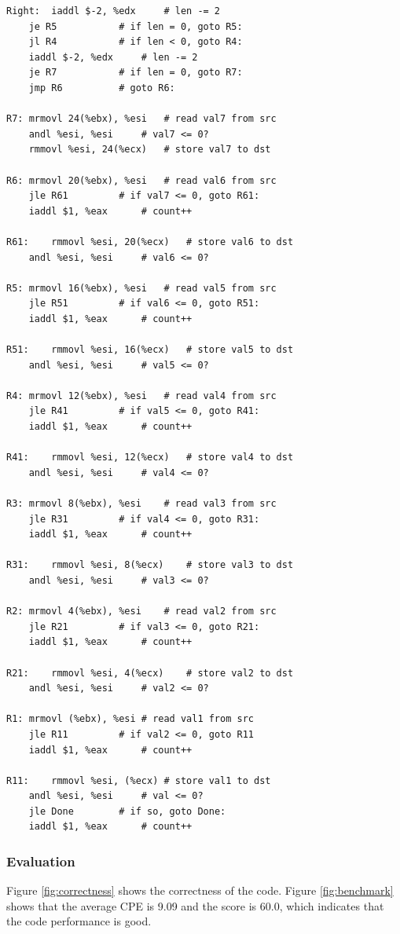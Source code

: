 \documentclass{article}
\begin{document}
\begin{lstlisting}[caption={Core Code of ncopy.ys}, label={cd:ncopy}]
Right:	iaddl $-2, %edx		# len -= 2
	je R5			# if len = 0, goto R5:
	jl R4			# if len < 0, goto R4:
	iaddl $-2, %edx		# len -= 2
	je R7			# if len = 0, goto R7:
	jmp R6			# goto R6:

R7:	mrmovl 24(%ebx), %esi	# read val7 from src
	andl %esi, %esi		# val7 <= 0?
	rmmovl %esi, 24(%ecx)	# store val7 to dst

R6:	mrmovl 20(%ebx), %esi	# read val6 from src
	jle R61			# if val7 <= 0, goto R61:
	iaddl $1, %eax		# count++

R61:	rmmovl %esi, 20(%ecx)	# store val6 to dst
	andl %esi, %esi		# val6 <= 0?

R5:	mrmovl 16(%ebx), %esi	# read val5 from src
	jle R51			# if val6 <= 0, goto R51:
	iaddl $1, %eax		# count++

R51:	rmmovl %esi, 16(%ecx)	# store val5 to dst
	andl %esi, %esi		# val5 <= 0?

R4:	mrmovl 12(%ebx), %esi	# read val4 from src
	jle R41			# if val5 <= 0, goto R41:
	iaddl $1, %eax		# count++
	
R41:	rmmovl %esi, 12(%ecx)	# store val4 to dst
	andl %esi, %esi		# val4 <= 0?

R3:	mrmovl 8(%ebx), %esi	# read val3 from src
	jle R31			# if val4 <= 0, goto R31:
	iaddl $1, %eax		# count++

R31:	rmmovl %esi, 8(%ecx)	# store val3 to dst
	andl %esi, %esi		# val3 <= 0?

R2:	mrmovl 4(%ebx), %esi	# read val2 from src
	jle R21			# if val3 <= 0, goto R21:
	iaddl $1, %eax		# count++

R21:	rmmovl %esi, 4(%ecx)	# store val2 to dst
	andl %esi, %esi		# val2 <= 0?

R1:	mrmovl (%ebx), %esi	# read val1 from src
	jle R11			# if val2 <= 0, goto R11
	iaddl $1, %eax		# count++

R11:	rmmovl %esi, (%ecx)	# store val1 to dst
	andl %esi, %esi		# val <= 0?
	jle Done		# if so, goto Done:
	iaddl $1, %eax		# count++

\end{lstlisting}

\subsubsection{Evaluation}

Figure \ref{fig:correctness} shows the correctness of the code. Figure \ref{fig:benchmark} shows that the average CPE is 9.09 and the score is 60.0, which indicates that the code performance is good.
\end{document}
